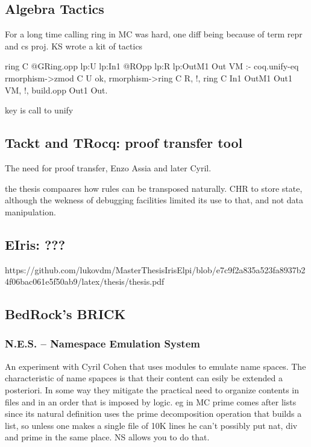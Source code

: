\documentclass[a4paper, 11pt]{book}
\begin{document}
\subsection{Algebra Tactics}

For a long time calling ring in MC was hard, one diff
being because of term
repr and cs proj. KS wrote a kit of tactics

\cite{sakaguchi:LIPIcs.ITP.2022.29}

\begin{elpicode}
ring C {{ @GRing.opp lp:U lp:In1 }} {{ @ROpp lp:R lp:OutM1 }} Out VM :-
  coq.unify-eq { rmorphism->zmod C } U ok,
  rmorphism->ring C R, !,
  ring C In1 OutM1 Out1 VM, !,
  build.opp Out1 Out.  
\end{elpicode}

key is call to unify

\subsection{Tackt and TRocq: proof transfer tool}

The need for proof transfer, Enzo Assia and later Cyril.

\cite{DBLP:conf/cpp/Blot0CPKMV23}
\cite{10.1007/978-3-031-57262-3_10}

the thesis compaares how rules can be transposed naturally.
CHR to store state, although the wekness of debugging
facilities limited its use to that, and not data manipulation.

\subsection{EIris: ???}

https://github.com/lukovdm/MasterThesisIrisElpi/blob/e7c9f2a835a523fa8937b24f06bac061e5f50ab9/latex/thesis/thesis.pdf

\subsection{BedRock's BRICK}
\subsubsection{N.E.S. -- Namespace Emulation System}

An experiment with Cyril Cohen that uses modules to emulate name spaces.
The characteristic of name spapces is that their content can esily be extended
a posteriori. In some way they mitigate the practical need to organize contents in
files and in an order that is imposed by logic.
eg in MC prime comes after lists since its natural definition uses the prime
decomposition operation that builds a list, so unless one makes a single file
of 10K lines he can't possibly put nat, div and prime in the same place.
NS allows you to do that.
\end{document}
